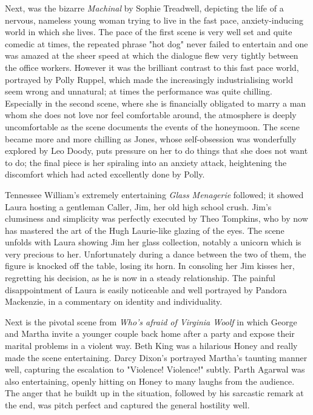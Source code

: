 Next, was the bizarre \textit{Machinal} by Sophie Treadwell, depicting the
life of a nervous, nameless young woman trying to live in the fast pace,
anxiety-inducing world in which she lives. The pace of the first scene
is very well set and quite comedic at times, the repeated phrase "hot
dog" never failed to entertain and one was amazed at the sheer speed at
which the dialogue flew very tightly between the office workers. However
it was the brilliant contrast to this fast pace world, portrayed by
Polly Ruppel, which made the increasingly industrialising world seem
wrong and unnatural; at times the performance was quite chilling.
Especially in the second scene, where she is financially obligated to
marry a man whom she does not love nor feel comfortable around, the
atmosphere is deeply uncomfortable as the scene documents the events of
the honeymoon. The scene became more and more chilling as Jones, whose
self-obsession was wonderfully explored by Leo Doody, puts pressure on
her to do things that she does not want to do; the final piece is her
spiraling into an anxiety attack, heightening the discomfort which had
acted excellently done by Polly.

Tennessee William's extremely entertaining \textit{Glass Menagerie}
followed; it showed Laura hosting a gentleman Caller, Jim, her old high
school crush. Jim's clumsiness and simplicity was perfectly executed by
Theo Tompkins, who by now has mastered the art of the Hugh Laurie-like
glazing of the eyes. The scene unfolds with Laura showing Jim her glass
collection, notably a unicorn which is very precious to her.
Unfortunately during a dance between the two of them, the figure is
knocked off the table, losing its horn. In consoling her Jim kisses her,
regretting his decision, as he is now in a steady relationship. The
painful disappointment of Laura is easily noticeable and well portrayed
by Pandora Mackenzie, in a commentary on identity and individuality.

Next is the pivotal scene from \textit{Who's afraid of Virginia Woolf} in
which George and Martha invite a younger couple back home after a party
and expose their marital problems in a violent way. Beth King was a
hilarious Honey and really made the scene entertaining. Darcy Dixon's
portrayed Martha's taunting manner well, capturing the escalation to
"Violence! Violence!" subtly. Parth Agarwal was also entertaining,
openly hitting on Honey to many laughs from the audience. The anger that
he buildt up in the situation, followed by his sarcastic remark at the
end, was pitch perfect and captured the general hostility well.

